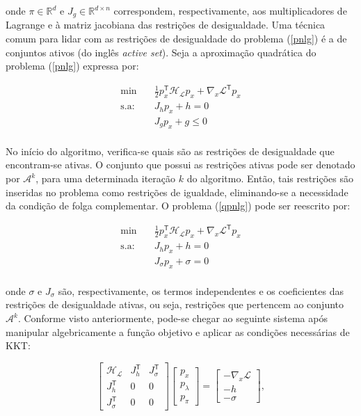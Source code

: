 \documentclass[
	12pt,				%
	openany,			%
	twoside,			%
	a4paper,			%
	chapter=TITLE,		%
	section=Title,		%
	subsection=Title,	%
	subsubsection=Title,%
	english,			%
	french,				%
	spanish,			%
	brazil			%
	]{abntex2}
\begin{document}
\begin{ERRATA}
\noindent onde $\pi \in \mathbb{R}^d$ e $J_g \in \mathbb{R}^{d\times n}$ correspondem, respectivamente, aos multiplicadores de Lagrange e à matriz jacobiana das restrições de desigualdade. Uma técnica comum para lidar com as restrições de desigualdade do problema (\ref{pnlg}) é a de conjuntos ativos (do inglês \emph{active set}). Seja a aproximação quadrática do problema (\ref{pnlg}) expressa por:

\begin{equation} \label{qpnlg}
\begin{aligned}
\text{min}  & \quad \frac{1}{2}p_x^\mathsf{T}\mathcal{H_L}p_x + \nabla_x\mathcal{L}^\mathsf{T}p_x \\
\text{s.a:} &\quad   J_hp_x + h =0\\
&\quad   J_gp_x + g \leq 0\\
\end{aligned}
\end{equation}

No início do algoritmo, verifica-se quais são as restrições de desigualdade que encontram-se ativas. O conjunto que possui as restrições ativas pode ser denotado por $\mathcal{A}^k$, para uma determinada iteração $k$ do algoritmo. Então, tais restrições são inseridas no problema como restrições de igualdade, eliminando-se a necessidade da condição de folga complementar. O problema (\ref{qpnlg}) pode ser reescrito por:

\begin{equation} \label{qpnlga}
\begin{aligned}
\text{min}  & \quad \frac{1}{2}p_x^\mathsf{T}\mathcal{H_L}p_x + \nabla_x\mathcal{L}^\mathsf{T}p_x \\
\text{s.a:} &\quad   J_hp_x + h =0\\
&\quad   J_{\sigma}p_x + \sigma = 0\\
\end{aligned}
\end{equation}

\noindent onde $\sigma$ e $J_\sigma$ são, respectivamente, os termos independentes e os coeficientes das restrições de desigualdade ativas, ou seja, restrições que pertencem ao conjunto $\mathcal{A}^k$. Conforme visto anteriormente, pode-se chegar ao seguinte sistema após manipular algebricamente a função objetivo e aplicar as condições necessárias de KKT:

\begin{equation} \label{sis20}
\begin{bmatrix}
\mathcal{H_L} & J_h^\mathsf{T} & J_\sigma^\mathsf{T}\\
J_h^\mathsf{T} & 0 & 0\\
J_\sigma^\mathsf{T} & 0 & 0
\end{bmatrix}
\begin{bmatrix}
p_x\\
p_\lambda\\
p_\pi
\end{bmatrix}
=\begin{bmatrix}
-\nabla_x \mathcal{L}\\
-h\\
-\sigma
\end{bmatrix},
\end{equation}


\end{ERRATA}
\end{document}
